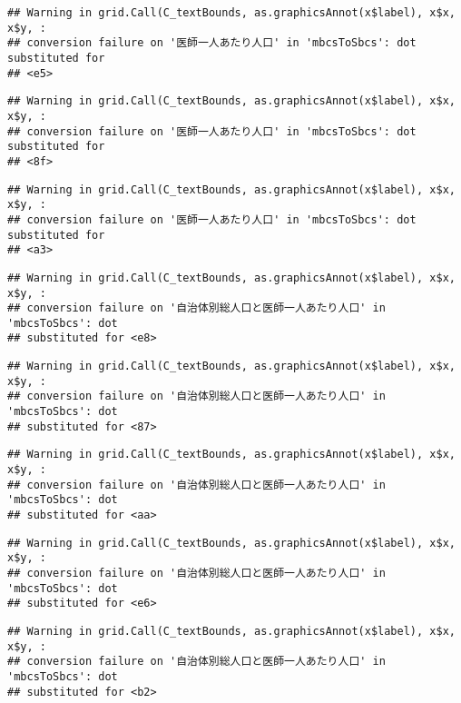 \documentclass[
]{article}
\begin{document}
\begin{verbatim}
## Warning in grid.Call(C_textBounds, as.graphicsAnnot(x$label), x$x, x$y, :
## conversion failure on '医師一人あたり人口' in 'mbcsToSbcs': dot substituted for
## <e5>
\end{verbatim}

\begin{verbatim}
## Warning in grid.Call(C_textBounds, as.graphicsAnnot(x$label), x$x, x$y, :
## conversion failure on '医師一人あたり人口' in 'mbcsToSbcs': dot substituted for
## <8f>
\end{verbatim}

\begin{verbatim}
## Warning in grid.Call(C_textBounds, as.graphicsAnnot(x$label), x$x, x$y, :
## conversion failure on '医師一人あたり人口' in 'mbcsToSbcs': dot substituted for
## <a3>
\end{verbatim}

\begin{verbatim}
## Warning in grid.Call(C_textBounds, as.graphicsAnnot(x$label), x$x, x$y, :
## conversion failure on '自治体別総人口と医師一人あたり人口' in 'mbcsToSbcs': dot
## substituted for <e8>
\end{verbatim}

\begin{verbatim}
## Warning in grid.Call(C_textBounds, as.graphicsAnnot(x$label), x$x, x$y, :
## conversion failure on '自治体別総人口と医師一人あたり人口' in 'mbcsToSbcs': dot
## substituted for <87>
\end{verbatim}

\begin{verbatim}
## Warning in grid.Call(C_textBounds, as.graphicsAnnot(x$label), x$x, x$y, :
## conversion failure on '自治体別総人口と医師一人あたり人口' in 'mbcsToSbcs': dot
## substituted for <aa>
\end{verbatim}

\begin{verbatim}
## Warning in grid.Call(C_textBounds, as.graphicsAnnot(x$label), x$x, x$y, :
## conversion failure on '自治体別総人口と医師一人あたり人口' in 'mbcsToSbcs': dot
## substituted for <e6>
\end{verbatim}

\begin{verbatim}
## Warning in grid.Call(C_textBounds, as.graphicsAnnot(x$label), x$x, x$y, :
## conversion failure on '自治体別総人口と医師一人あたり人口' in 'mbcsToSbcs': dot
## substituted for <b2>
\end{verbatim}
\end{document}
